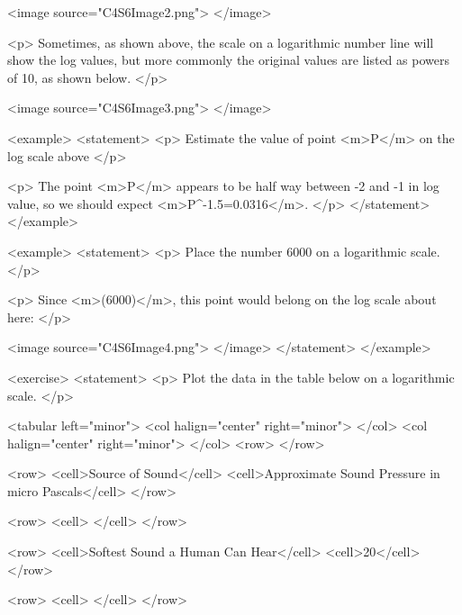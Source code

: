        <image source="C4S6Image2.png">
        </image>

        <p>
            Sometimes, as shown above, the scale on a logarithmic number line will show the log values, but more commonly the original values are listed as powers of 10, as shown below.
        </p>

        <image source="C4S6Image3.png">
        </image>

        <example>
            <statement>
                <p>
                    Estimate the value of point <m>P</m> on the log scale above
                </p>

                <p>
                    The point <m>P</m> appears to be half way between -2 and -1 in log value, so we should expect <m>P^{-1.5}=0.0316</m>.
                </p>
            </statement>
        </example>

        <example>
            <statement>
                <p>
                    Place the number 6000 on a logarithmic scale.
                </p>

                <p>
                    Since <m>\log(6000)</m>, this point would belong on the log scale about here:
                </p>

                <image source="C4S6Image4.png">
                </image>
            </statement>
        </example>

        <exercise>
            <statement>
                <p>
                    Plot the data in the table below on a logarithmic scale.
                </p>

                <tabular left="minor">
                    <col halign="center" right="minor"> </col> <col halign="center" right="minor"> </col>
                    <row>
                    </row>

                    <row>
                        <cell>Source of Sound</cell>
                        <cell>Approximate Sound Pressure in micro Pascals</cell>
                    </row>

                    <row>
                        <cell> </cell>
                    </row>

                    <row>
                        <cell>Softest Sound a Human Can Hear</cell>
                        <cell>20</cell>
                    </row>

                    <row>
                        <cell> </cell>
                    </row>

